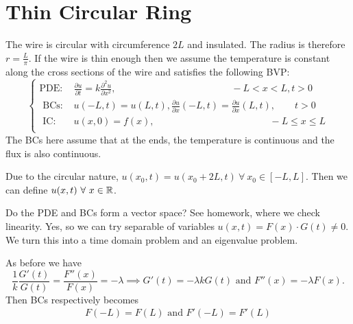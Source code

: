 \documentclass[class=article,crop=false]{standalone}
\begin{document}
\newpage
\section{Thin Circular Ring}
The wire is circular with circumference $ 2L$ and insulated. The radius is therefore $ r=\frac{L}{\pi}$. If the wire is thin enough then we assume the temperature is constant along the cross sections of the wire and satisfies the following BVP:
\begin{equation*}
\begin{cases}
	\text{PDE: }& \frac{\partial u}{\partial t} = k \frac{\partial^2 u}{\partial { x}^2} , \qquad \qquad \qquad  \qquad \qquad  \qquad  -L<x<L, t>0\\
	\text{ BCs: }& u(-L,t)  = u(L,t), \frac{\partial u}{\partial x} (-L,t) = \frac{\partial u}{\partial x} (L,t), \qquad  t>0 \\
	\text{ IC: }& u(x,0)=f(x), \qquad \qquad \qquad \qquad \qquad \qquad   -L \leq x \leq L \\
\end{cases}
\end{equation*}
The BCs here assume that at the ends, the temperature is continuous and the flux is also continuous.

Due to the circular nature, $ u(x_0,t) = u(x_0+2L,t) \ \forall \ x_0 \in [-L,L]$. Then we can define $ u(x,t) \ \forall \ x \in \mathbb{R}$.

Do the PDE and BCs form a vector space? See homework, where we check linearity. Yes, so we can try separable of variables $ u(x,t)=F(x) \cdot G(t) \neq 0$. We turn this into a time domain problem and an eigenvalue problem.

\begin{note}[]
As before we have
\[
	\frac{1}{k} \frac{G'(t)}{G(t) } = \frac{F''(x)}{F(x) } =-\lambda \implies G'(t) = -\lambda kG(t) \text{ and } F''(x) = - \lambda F(x) 
.\] 
Then BCs respectively becomes
\begin{align*}
	F(-L)=F(L) \text{ and } F'(-L)=F'(L) 
\end{align*}
\end{note}
\end{document}
